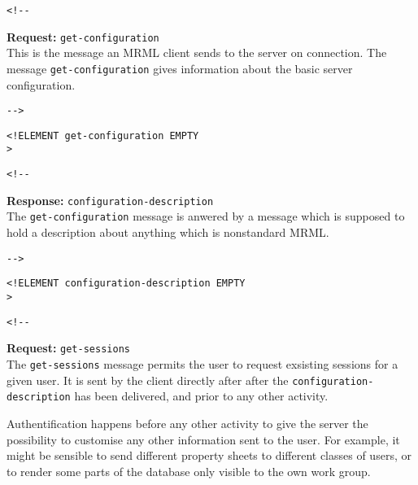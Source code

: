 \documentclass{article}
\newcommand{\requesttitle}[1]{\textbf{Request: }{\texttt{#1}}\\}
\newcommand{\responsetitle}[1]{\textbf{Response: }{\texttt{#1}}\\}
\newcommand{\MRML}{\textrm{MRML}}
\newcommand{\tag}[1]{\texttt{#1}}
\begin{document}
\begin{verbatim}<!--\end{verbatim}
  



\requesttitle{get-configuration}

This is the message an MRML client sends to the server on connection.
The message \tag{get-configuration} gives information about the basic server configuration.

       
 \begin{verbatim}-->\end{verbatim}



\begin{verbatim}
<!ELEMENT get-configuration EMPTY 
>\end{verbatim}

\begin{verbatim}<!--\end{verbatim}
  


\responsetitle{configuration-description}

The \tag{get-configuration} message is anwered by  a  message which
is supposed to hold a description about anything which is nonstandard \MRML.


       
 \begin{verbatim}-->\end{verbatim}



\begin{verbatim}
<!ELEMENT configuration-description EMPTY 
>\end{verbatim}

\begin{verbatim}<!--\end{verbatim}
   

     \requesttitle{get-sessions}

     The \tag{get-sessions} message permits the user to request
     exsisting sessions for a given user. It is sent by the client
     directly after after the \tag{configuration-description} has
     been delivered, and prior to any other activity. 

     Authentification happens before any other activity to give the 
     server the possibility to customise any other information sent
     to the user. For example, it might be sensible to send different
     property sheets to different classes of users, or to render some
     parts of the database only visible to the own work group.
     
\end{document}
